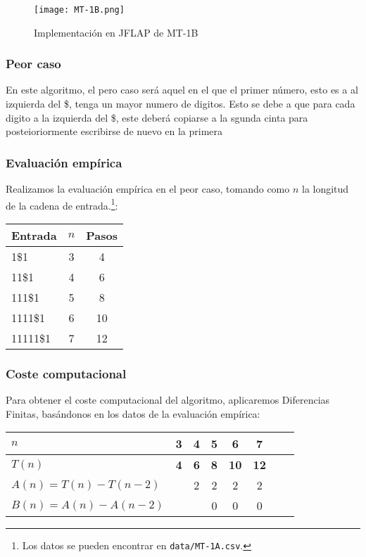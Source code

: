 \begin{figure}[h]
    \centering
    \texttt{[image: MT-1B.png]}
    \caption{Implementación en JFLAP de MT-1B}
    \label{fig:MT-1B}
\end{figure}


\subsubsection*{Peor caso}
En este algoritmo, el pero caso será aquel en el que el primer número, esto es a al izquierda del \$, tenga un mayor numero de digitos. Esto se debe a que para cada digito a la izquierda del \$, este deberá copiarse a la sgunda cinta  para posteioriormente escribirse de nuevo en la primera


\subsubsection*{Evaluación empírica}
Realizamos la evaluación empírica en el peor caso, tomando como $n$ la longitud de la cadena de entrada.\footnote{Los datos se pueden encontrar en \texttt{data/MT-1A.csv}.}:

\begin{table}[h]
    \centering
    \begin{tabular}{lcc}
        Entrada                    & $n$ & Pasos \\
        \hline
        1\$1                       & 3  &  4  \\
        11\$1                      & 4  &  6  \\
        111\$1                     & 5  &  8  \\
        1111\$1                    & 6  &  10  \\
        11111\$1                   & 7  &  12  \\
    \end{tabular}
\end{table}


\subsubsection*{Coste computacional}
Para obtener el coste computacional del algoritmo, aplicaremos Diferencias Finitas, basándonos en los datos de la evaluación empírica:

\begin{table}[h]
    \centering
    \begin{tabular}{|l|c|c|c|c|c|c|c|}
        \hline
        $n$ & \textbf{3} & \textbf{4} & \textbf{5} & \textbf{6} & \textbf{7}\\ \hline
        $T(n)$ & \textbf{4} & \textbf{6} & \textbf{8} & \textbf{10} & \textbf{12}      \\ \hline
        \hline
        $A(n) = T(n) - T(n-2)$ &    & 2 & 2 & 2 & 2 \\ \hline
        $B(n) = A(n) - A(n-2)$ &    &   & 0 & 0 & 0 \\ \hline
    \end{tabular}
\end{table}


